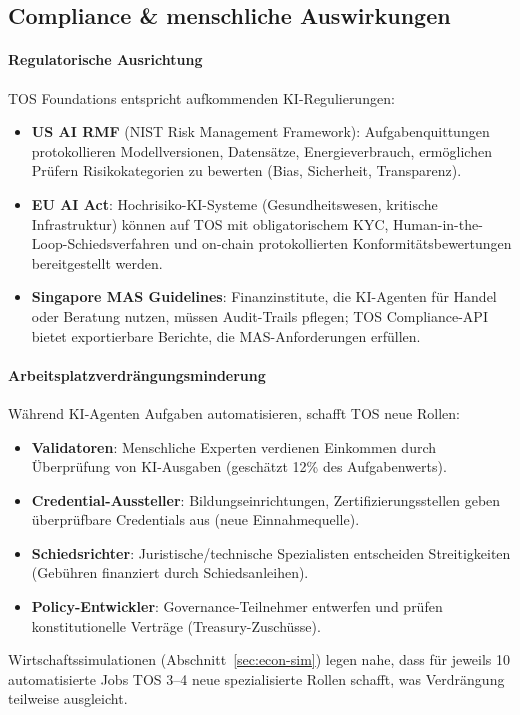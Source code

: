 \documentclass[11pt]{article}
\begin{document}
\subsection{Compliance \& menschliche Auswirkungen}
\paragraph{Regulatorische Ausrichtung} TOS Foundations entspricht aufkommenden KI-Regulierungen:
\begin{itemize}[noitemsep]
  \item \textbf{US AI RMF} (NIST Risk Management Framework): Aufgabenquittungen protokollieren Modellversionen, Datensätze, Energieverbrauch, ermöglichen Prüfern Risikokategorien zu bewerten (Bias, Sicherheit, Transparenz).
  \item \textbf{EU AI Act}: Hochrisiko-KI-Systeme (Gesundheitswesen, kritische Infrastruktur) können auf TOS mit obligatorischem KYC, Human-in-the-Loop-Schiedsverfahren und on-chain protokollierten Konformitätsbewertungen bereitgestellt werden.
  \item \textbf{Singapore MAS Guidelines}: Finanzinstitute, die KI-Agenten für Handel oder Beratung nutzen, müssen Audit-Trails pflegen; TOS Compliance-API bietet exportierbare Berichte, die MAS-Anforderungen erfüllen.
\end{itemize}

\paragraph{Arbeitsplatzverdrängungsminderung} Während KI-Agenten Aufgaben automatisieren, schafft TOS neue Rollen:
\begin{itemize}[noitemsep]
  \item \textbf{Validatoren}: Menschliche Experten verdienen Einkommen durch Überprüfung von KI-Ausgaben (geschätzt 12\% des Aufgabenwerts).
  \item \textbf{Credential-Aussteller}: Bildungseinrichtungen, Zertifizierungsstellen geben überprüfbare Credentials aus (neue Einnahmequelle).
  \item \textbf{Schiedsrichter}: Juristische/technische Spezialisten entscheiden Streitigkeiten (Gebühren finanziert durch Schiedsanleihen).
  \item \textbf{Policy-Entwickler}: Governance-Teilnehmer entwerfen und prüfen konstitutionelle Verträge (Treasury-Zuschüsse).
\end{itemize}
Wirtschaftssimulationen (Abschnitt~\ref{sec:econ-sim}) legen nahe, dass für jeweils 10 automatisierte Jobs TOS 3--4 neue spezialisierte Rollen schafft, was Verdrängung teilweise ausgleicht.
\end{document}
